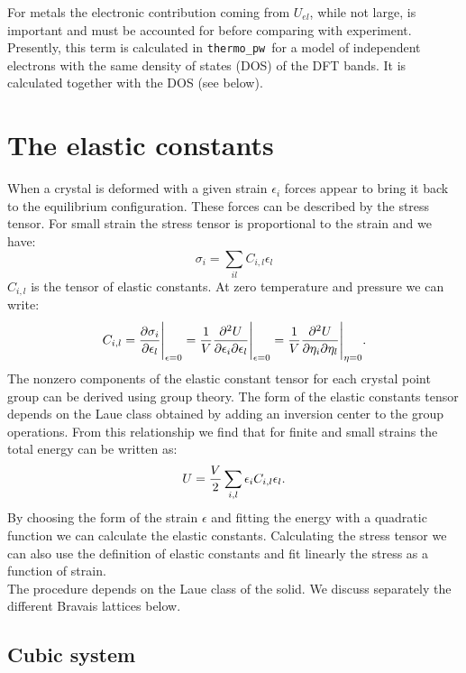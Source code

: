 \documentclass[12pt,a4paper]{article}
\def\tpw{\texttt{thermo\_pw}}
\begin{document}
For metals the electronic contribution coming from $U_{el}$, while not large, 
is important 
and must be accounted for before comparing with experiment. Presently,
this term is calculated in \tpw\ for a model of independent electrons with
the same density of states (DOS) of the DFT bands. It is calculated together 
with the DOS (see below).

\newpage
\section{\color{coral}The elastic constants}

When a crystal is deformed with a given strain $\epsilon_i$ forces
appear to bring it back to the equilibrium configuration. These
forces can be described by the stress tensor. For small strain the 
stress tensor is proportional to the strain and we have:
\begin{equation}
\sigma_{i} =\sum_{il} C_{i,l} \epsilon_l 
\end{equation}
$C_{i,l}$ is the tensor of elastic constants. 
At zero temperature and pressure we can write:
\begin{equation}
C_{i,l}= {\partial \sigma_i \over \partial \epsilon_{l}}\Bigg|_{\epsilon=0}=
{1 \over V}{\partial^2 U \over \partial \epsilon_i \partial \epsilon_l}
\Bigg|_{\epsilon=0} = 
{1 \over V}{\partial^2 U \over \partial \eta_i \partial \eta_l}
\Bigg|_{\eta=0}
.
\end{equation}
The nonzero components of the elastic constant tensor for each crystal point
group can be derived using group theory. The form of the elastic constants
tensor depends on the Laue class obtained by adding an inversion center to
the group operations. From this relationship we find that for finite
and small strains the total energy can be written as:
\begin{equation}
U= {V \over 2} \sum_{i,l} \epsilon_i C_{i,l} \epsilon_l.
\end{equation}
By choosing the form of the strain $\epsilon$ and fitting the
energy with a quadratic function we can calculate the elastic constants.
Calculating the stress tensor we can also use the definition
of elastic constants and fit linearly the stress as a function of strain. \\
The procedure depends on the Laue class of the solid. We discuss separately
the different Bravais lattices below.

\subsection{\color{web-blue}Cubic system}
\end{document}

